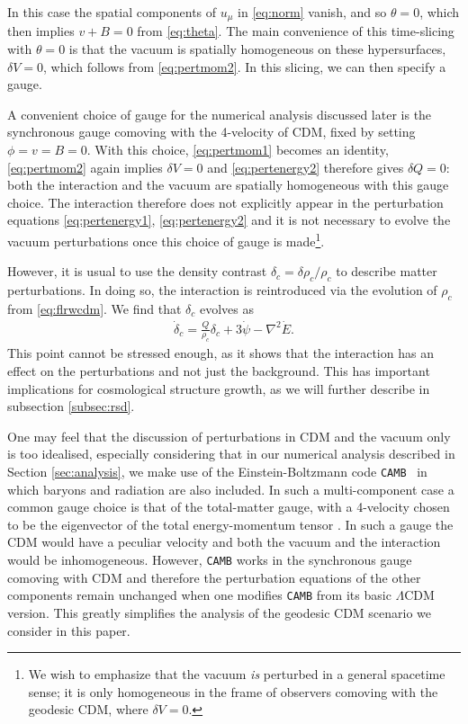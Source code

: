 \documentclass[a4paper,fleqn,usenatbib]{mnras}
\begin{document}
In  this case the spatial components of $u_\mu$ in \eqref{eq:norm} vanish, and so $\theta =0$, which then implies  $v+B=0$  from \eqref{eq:theta}. The main convenience of this time-slicing with $\theta =0$ is that the vacuum is spatially homogeneous on these hypersurfaces,  $\delta V =0$, which follows from \eqref{eq:pertmom2}. In this slicing, we can then specify a gauge.

A convenient choice of gauge for the numerical analysis discussed later is the synchronous gauge comoving with the 4-velocity of CDM, fixed by setting $\phi = v = B = 0$. With this choice, \eqref{eq:pertmom1} becomes an identity, \eqref{eq:pertmom2} again implies $\delta V =0$ and \eqref{eq:pertenergy2} therefore gives $\delta Q =0$: both the interaction and the vacuum are spatially homogeneous with this gauge choice. The interaction therefore does not explicitly appear in the perturbation equations \eqref{eq:pertenergy1}, \eqref{eq:pertenergy2} and it is not necessary to evolve the vacuum perturbations once this choice of gauge is made\footnote{We wish to emphasize that the vacuum \textit{is} perturbed in a general spacetime sense; it is only homogeneous in the frame of observers comoving with  the geodesic CDM, where $\delta V=0$.}.

However, it is usual to use the density contrast $\delta_c = \delta \rho_c /\rho_c$ to describe matter perturbations. In doing so, the interaction is reintroduced via the evolution of $\rho_c$ from \eqref{eq:flrwcdm}. We find that $\delta_c$ evolves as
\begin{align}
\dot{\delta}_c = \frac{Q}{\rho_c}\delta_c + 3 \dot{\psi} - \nabla^2 \dot{E} \label{eq:densitycontrast}.
\end{align}
This point cannot be stressed enough, as it shows that the interaction has an effect on the perturbations and not just the background. This has important implications for cosmological structure growth, as we will further describe in subsection \ref{subsec:rsd}.

One may feel that the discussion of perturbations in CDM and the vacuum only is too idealised, especially considering that in our numerical analysis described in Section \ref{sec:analysis}, we make use of the Einstein-Boltzmann code \texttt{CAMB}~\citep{Lewis:1999bs,Howlett:2012mh} in which baryons and radiation are also included. In such a multi-component case a common gauge choice is that of the total-matter gauge, with a 4-velocity chosen to be the eigenvector of the total energy-momentum tensor \citep{1984PThPS..78....1K}. In such a gauge the CDM would have a peculiar velocity and both the vacuum and the interaction would be inhomogeneous. However, \texttt{CAMB} works in the synchronous gauge comoving with CDM and therefore the perturbation equations of the other components remain unchanged when one modifies \texttt{CAMB} from its basic $\Lambda$CDM version. This greatly simplifies the analysis of the geodesic CDM scenario we consider in this paper.
\end{document}

